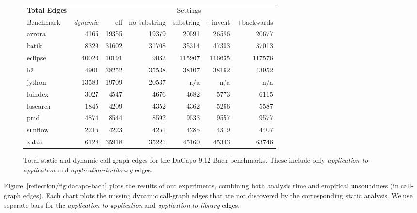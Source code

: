 \begin{figure}[h]
  \renewcommand{\tabcolsep}{1.5mm}
  \centering
  \begin{tabular}{lr@{ \quad }rrrrr}
    \toprule
    \textbf{Total Edges} & & \multicolumn{5}{c}{Settings} \\
    \cmidrule(l){3-7}
    Benchmark & \emph{dynamic} & elf & no substring 
              & substring & +invent & +backwards
    \\
    \midrule
    avrora & 4165 & 19355 & 19379 & 20591 & 26586 & 20677 \\
    batik & 8329 & 31602 & 31708 & 35314 & 47303 & 37013 \\
    eclipse & 40026 & 10191 & 9032 & 115967 & 116635 & 117576 \\
    h2 & 4901 & 38252 & 35538 & 38107 & 38162 & 43952 \\
    jython & 13583 & 19709 & 20537 & n/a & n/a & n/a \\
    luindex & 3027 & 4547 & 4676 & 4682 & 5773 & 6115 \\
    lusearch & 1845 & 4209 & 4352 & 4362 & 5266 & 5587 \\
    pmd & 4874 & 8544 & 8592 & 9533 & 9557 & 9577 \\
    sunflow & 2215 & 4223 & 4251 & 4285 & 4319 & 4407 \\
    xalan & 6128 & 35918 & 35221 & 45160 & 45343 & 63746 \\
    \bottomrule
  \end{tabular}
  \caption[Total static and dynamic call-graph edges -- DaCapo
  9.12-Bach benchmarks]{Total static and dynamic call-graph edges for
    the DaCapo 9.12-Bach benchmarks. These include only
    \emph{application-to-application} and
    \emph{application-to-library} edges.}
  \label{reflection/fig:total_static}
\end{figure}


Figure~\ref{reflection/fig:dacapo-bach} plots the results of our experiments,
combining both analysis time and empirical unsoundness (in call-graph
edges). 
Each chart plots the
missing dynamic call-graph edges that are not discovered by the
corresponding static analysis. We use separate bars for the
\emph{application-to-application} and \emph{application-to-library}
edges.

